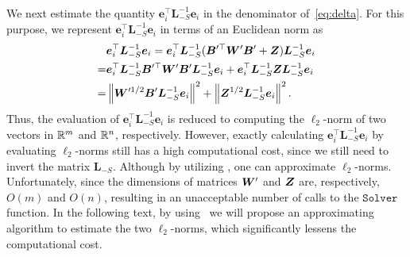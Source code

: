 \documentclass[10pt,twocolumn,twoside]{IEEEtran}
\begin{document}
We next estimate the quantity $\mathbf{e}_i^\top \mathbf{L}_{-S}^{-1}\mathbf{e}_i$ in the denominator  of~\eqref{eq:delta}. For this purpose,
we represent $\mathbf{e}_i^\top \mathbf{L}_{-S}^{-1}\mathbf{e}_i$ in terms of an Euclidean norm as
\begin{equation}\label{eq:denom-solver}
    \begin{split}
        & \boldsymbol{e}_i^\top\boldsymbol{L}_{-S}^{-1}\boldsymbol{e}_i
        =\boldsymbol{e}_i^\top\boldsymbol{L}_{-S}^{-1}(\boldsymbol{B}'^\top\boldsymbol{W}'\boldsymbol{B}'+\boldsymbol{Z})\boldsymbol{L}_{-S}^{-1}\boldsymbol{e}_i\\
        =&\boldsymbol{e}_i^\top\boldsymbol{L}_{-S}^{-1}\boldsymbol{B}'^\top\boldsymbol{W}'\boldsymbol{B}'\boldsymbol{L}_{-S}^{-1}\boldsymbol{e}_i+\boldsymbol{e}_i^\top\boldsymbol{L}_{-S}^{-1}\boldsymbol{Z}\boldsymbol{L}_{-S}^{-1}\boldsymbol{e}_i\\
        =&\left\Vert\boldsymbol{W}'^{1/2}\boldsymbol{B}'\boldsymbol{L}_{-S}^{-1}\boldsymbol{e}_i\right\Vert^2+\left\Vert\boldsymbol{Z}^{1/2}\boldsymbol{L}_{-S}^{-1}\boldsymbol{e}_i\right\Vert^2.
    \end{split}
\end{equation}
Thus, the evaluation of $\mathbf{e}_i^\top \mathbf{L}_{-S}^{-1}\mathbf{e}_i$ is reduced to computing  the $\ell_2$-norm of two vectors in $\mathbb{R}^m$ and $\mathbb{R}^n$, respectively. However, exactly calculating $\mathbf{e}_i^\top \mathbf{L}_{-S}^{-1}\mathbf{e}_i$ by evaluating $\ell_2$-norms still has a high computational cost, since we still need to invert the matrix  $\mathbf{L}_{-S}$. Although by utilizing , one can approximate $\ell_2$-norms. Unfortunately,  since the dimensions of matrices \(\boldsymbol{W}'\) and \(\boldsymbol{Z}\) are, respectively,  $O(m)$ and  $O(n)$, resulting in an unacceptable number of calls to the \(\mathtt{Solver}\) function. In the following text, by using~ we will propose an approximating algorithm to estimate the two $\ell_2$-norms, which significantly lessens the computational cost.
\end{document}
